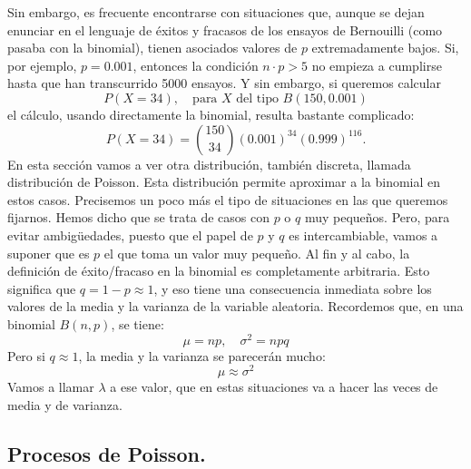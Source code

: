 Sin embargo, es frecuente encontrarse con situaciones que, aunque se dejan enunciar en el lenguaje
de éxitos y fracasos de los ensayos de Bernouilli (como pasaba con la binomial), tienen asociados
valores de $p$ extremadamente bajos. Si, por ejemplo, $p=0.001$, entonces la condición $n\cdot p>5$
no empieza a cumplirse hasta que han transcurrido 5000 ensayos. Y sin embargo, si queremos calcular
    \[P(X=34),\quad\mbox{para $X$ del tipo }B(150,0.001)\]
el cálculo, usando directamente la binomial, resulta bastante complicado:
    \[P(X=34)=\binom{150}{34}\left(0.001\right)^{34}(0.999)^{116}.\]
En esta sección vamos a ver otra distribución, también discreta, llamada {\sf distribución de
Poisson}. Esta distribución permite
aproximar a la binomial en estos casos. Precisemos un poco más el tipo de situaciones en las que
queremos fijarnos. Hemos dicho que se trata de casos con $p$ o $q$ muy pequeños. Pero, para evitar
ambigüedades, puesto que el papel de $p$ y $q$ es intercambiable, vamos a suponer que es $p$ el que
toma un valor muy pequeño. Al fin y al cabo, la definición de éxito/fracaso en la binomial es
completamente arbitraria. Esto significa que $q=1-p\approx 1$, y  eso tiene una consecuencia
inmediata sobre los valores de la media y la varianza de la variable aleatoria. Recordemos que, en
una binomial $B(n,p)$, se tiene:
\[\mu=n p,\quad \sigma^2=n p q\]
Pero si $q\approx 1$, la media y la varianza se parecerán mucho:
\[\mu\approx \sigma^2\]
Vamos a llamar $\lambda$ a ese valor, que en estas situaciones va a hacer las veces de media y de
varianza.

\subsection{Procesos de Poisson.}
\label{cap08:subsec:ProcesosPoisson}

